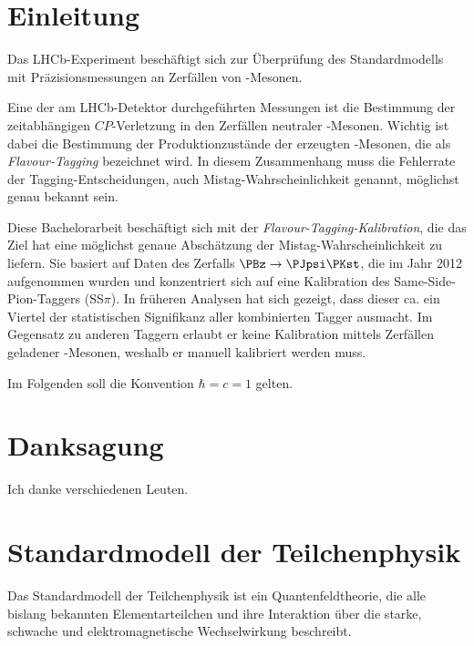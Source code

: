 \newcommand{\difference}[1]{\mathrm{\Delta} #1}

\section{Einleitung}

Das LHCb-Experiment beschäftigt sich zur Überprüfung des Standardmodells mit Präzisionsmessungen an Zerfällen von \PB-Mesonen.

Eine der am LHCb-Detektor durchgeführten Messungen ist die Bestimmung der zeitabhängigen $CP$-Verletzung in den Zerfällen neutraler \PB-Mesonen.
Wichtig ist dabei die Bestimmung der Produktionzustände der erzeugten \PB-Mesonen, die als \emph{Flavour-Tagging} bezeichnet wird.
In diesem Zusammenhang muss die Fehlerrate der Tagging-Entscheidungen, auch Mistag-Wahrscheinlichkeit genannt, möglichst genau bekannt sein.

Diese Bachelorarbeit beschäftigt sich mit der \emph{Flavour-Tagging-Kalibration}, die das Ziel hat eine möglichst genaue Abschätzung der Mistag-Wahrscheinlichkeit zu liefern.
Sie basiert auf Daten des Zerfalls $\PBz \to \PJpsi\PKst$, die im Jahr 2012 aufgenommen wurden und konzentriert sich auf eine Kalibration des Same-Side-Pion-Taggers (SS$π$).
In früheren Analysen hat sich gezeigt, dass dieser ca. ein Viertel der statistischen Signifikanz aller kombinierten Tagger ausmacht.
Im Gegensatz zu anderen Taggern erlaubt er keine Kalibration mittels Zerfällen geladener \PB-Mesonen, weshalb er manuell kalibriert werden muss.

Im Folgenden soll die Konvention $\hbar = c = 1$ gelten.

\newpage

\section*{Danksagung}

Ich danke verschiedenen Leuten.

\newpage


\section{Standardmodell der Teilchenphysik}
\label{standard-model}

Das Standardmodell der Teilchenphysik ist ein Quantenfeldtheorie, die alle bislang bekannten Elementarteilchen und ihre Interaktion über die starke, schwache und elektromagnetische Wechselwirkung beschreibt.

